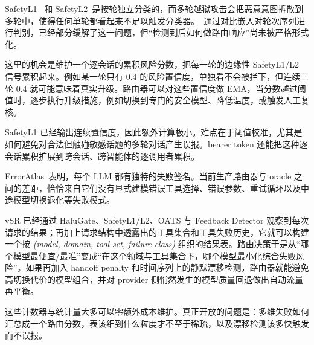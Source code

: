 \begin{opportunity}[累积式多轮风险评分]
\label{opp:cumulative-risk}
SafetyL1~\cite{safetyl1_2026} 和 SafetyL2~\cite{safetyl2_2026}是按轮独立分类的，而多轮越狱攻击会把恶意意图拆散到多轮中，使得任何单轮都看起来不足以触发分类器。\vsr{}~\cite{vllmsr2026}通过对比嵌入对轮次序列进行判别，已经部分缓解了这一问题，但“检测到后如何做路由响应”尚未被严格形式化。

这里的机会是维护一个逐会话的累积风险分数，把每一轮的边缘性 SafetyL1/L2 信号累积起来。例如某一轮只有 0.4 的风险置信度，单独看不会被拦下，但连续三轮 0.4 就可能意味着真实升级。路由器可以对这些置信度做 EMA，当分数越过阈值时，逐步执行升级措施，例如切换到专门的安全模型、降低温度，或触发人工复核。

\begin{frisk}
SafetyL1 已经输出连续置信度，因此额外计算极小。难点在于阈值校准，尤其是如何避免对合法但触碰敏感话题的多轮对话产生误报。bearer token 还能把这种逐会话累积扩展到跨会话、跨智能体的逐调用者累积。
\end{frisk}
\end{opportunity}

\begin{opportunity}[基于路由器结果记忆的失败类别感知路由]
\label{opp:failure-routing}
ErrorAtlas~\cite{erroratlas2026}表明，每个 LLM 都有独特的失败签名。当前生产路由器与 oracle 之间的差距，恰恰来自它们没有显式建模错误工具选择、错误参数、重试循环以及中途模型切换退化等失败模式。

vSR 已经通过 HaluGate、SafetyL1/L2、OATS 与 Feedback Detector 观察到每次请求的结果；再加上请求结构中透露出的工具集合和工具失败历史，它就可以构建一个按 \emph{(model, domain, tool-set, failure class)} 组织的结果表。路由决策于是从“哪个模型最便宜/最准”变成“在这个领域与工具集合下，哪个模型最小化综合失败风险”。如果再加入 handoff penalty 和时间序列上的静默漂移检测，路由器就能避免高切换代价的模型组合，并对 provider 侧悄然发生的模型质量回退做出自动流量再平衡。

\begin{frisk}
这些计数器与统计量大多可以零额外成本维护。真正开放的问题是：多维失败如何汇总成一个路由分数，表该细到什么粒度才不至于稀疏，以及漂移检测该多快触发而不误报。
\end{frisk}
\end{opportunity}

